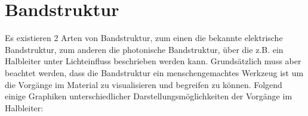 	\section{Bandstruktur}
	Es existieren 2 Arten von Bandstruktur, zum einen die bekannte elektrische Bandstruktur, zum anderen die photonische Bandstruktur, über die z.B. ein Halbleiter unter Lichteinfluss beschrieben werden kann. Grundsätzlich muss aber beachtet werden, dass die Bandstruktur ein menschengemachtes Werkzeug ist um die Vorgänge im Material zu visualisieren und begreifen zu können. Folgend einige Graphiken unterschiedlicher Darstellungsmöglichkeiten der Vorgänge im Halbleiter:
\begin{figure}[H]
	\begin{minipage}{.5\linewidth}
		\centering
	\end{minipage}%
	\begin{minipage}{.5\linewidth}
		\centering

\end{minipage}
\end{figure}
